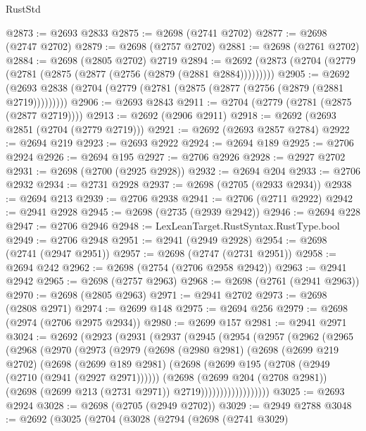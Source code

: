 \begin{lexlean}{RustStd}
\begin{coremodule}
{\begin{coremodule}
{{{{{{{{{{{{{{{{{{{{{{{{{{@2873 := @2693 @2833
@2875 := @2698 (@2741 @2702)
@2877 := @2698 (@2747 @2702)
@2879 := @2698 (@2757 @2702)
@2881 := @2698 (@2761 @2702)
@2884 := @2698 (@2805 @2702) @2719
@2894 := @2692 (@2873 (@2704 (@2779 (@2781 (@2875 (@2877 (@2756 (@2879 (@2881 @2884)))))))))
@2905 := @2692 (@2693 @2838 (@2704 (@2779 (@2781 (@2875 (@2877 (@2756 (@2879 (@2881 @2719)))))))))
@2906 := @2693 @2843
@2911 := @2704 (@2779 (@2781 (@2875 (@2877 @2719))))
@2913 := @2692 (@2906 @2911)
@2918 := @2692 (@2693 @2851 (@2704 (@2779 @2719)))
@2921 := @2692 (@2693 @2857 @2784)
@2922 := @2694 @219
@2923 := @2693 @2922
@2924 := @2694 @189
@2925 := @2706 @2924
@2926 := @2694 @195
@2927 := @2706 @2926
@2928 := @2927 @2702
@2931 := @2698 (@2700 (@2925 @2928))
@2932 := @2694 @204
@2933 := @2706 @2932
@2934 := @2731 @2928
@2937 := @2698 (@2705 (@2933 @2934))
@2938 := @2694 @213
@2939 := @2706 @2938
@2941 := @2706 (@2711 @2922)
@2942 := @2941 @2928
@2945 := @2698 (@2735 (@2939 @2942))
@2946 := @2694 @228
@2947 := @2706 @2946
@2948 := LexLeanTarget.RustSyntax.RustType.bool
@2949 := @2706 @2948
@2951 := @2941 (@2949 @2928)
@2954 := @2698 (@2741 (@2947 @2951))
@2957 := @2698 (@2747 (@2731 @2951))
@2958 := @2694 @242
@2962 := @2698 (@2754 (@2706 @2958 @2942))
@2963 := @2941 @2942
@2965 := @2698 (@2757 @2963)
@2968 := @2698 (@2761 (@2941 @2963))
@2970 := @2698 (@2805 @2963)
@2971 := @2941 @2702
@2973 := @2698 (@2808 @2971)
@2974 := @2699 @148
@2975 := @2694 @256
@2979 := @2698 (@2974 (@2706 @2975 @2934))
@2980 := @2699 @157
@2981 := @2941 @2971
@3024 := @2692
    (@2923
      (@2931
        (@2937
          (@2945
            (@2954
              (@2957
                (@2962
                  (@2965
                    (@2968
                      (@2970
                        (@2973
                          (@2979
                            (@2698
                              (@2980 @2981)
                              (@2698
                                (@2699 @219 @2702)
                                (@2698
                                  (@2699 @189 @2981)
                                  (@2698
                                    (@2699 @195 (@2708 (@2949 (@2710 (@2941 (@2927 @2971))))))
                                    (@2698
                                      (@2699 @204 (@2708 @2981))
                                      (@2698 (@2699 @213 (@2731 @2971)) @2719))))))))))))))))))
@3025 := @2693 @2924
@3028 := @2698 (@2705 (@2949 @2702))
@3029 := @2949 @2788
@3048 := @2692
    (@3025
      (@2704
        (@3028
          (@2794
            (@2698
              (@2741 @3029)
}}}}}}}}}}}}}}}}}}}}}}}}}}
\end{coremodule}}
\end{coremodule}
\end{lexlean}
